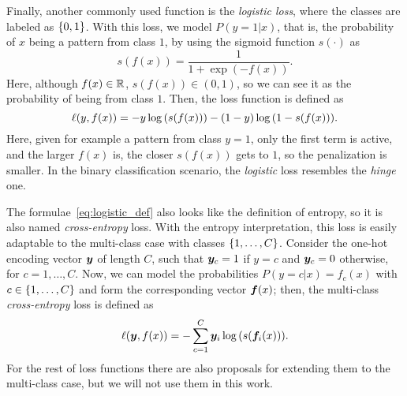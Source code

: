 %
Finally, another commonly used function is the \emph{logistic loss}, where the classes are labeled as $\left\{0, 1\right\}$. With this loss, we model $P(y=1 \vert x)$, that is, the probability of $x$ being a pattern from class $1$, by using the sigmoid function $s(\cdot)$ as 
$$ s(f(x)) = \frac{1}{1 + \exp{(-f(x))}} .$$
Here, although $f(x) \in \mathbb{R}$, $s(f(x)) \in (0, 1)$, so we can see it as the probability of being from class $1$. Then, the loss function is defined as 
\begin{equation}
    \label{eq:logistic_def}
    \lossf(y, f(x)) = - y \log{(s(f(x)))} - (1 - y) \log{(1 - s(f(x)))} .
\end{equation} 
Here, given for example a pattern from class $y=1$, only the first term is active, and the larger $f(x)$ is, the closer $s(f(x))$ gets to $1$, so the penalization is smaller.
In the binary classification scenario, the \emph{logistic} loss resembles the \emph{hinge} one. 

The formulae~\eqref{eq:logistic_def} also looks like the definition of entropy, so it is also named \emph{cross-entropy} loss. 
With the entropy interpretation, this loss is easily adaptable to the multi-class case with classes $\left\{1, \ldots, C\right\}$. Consider the one-hot encoding vector $\bm{y}$ of length $C$, such that $\bm{y}_c = 1$ if $y=c$ and $\bm{y}_c = 0$ otherwise, for $c=1, \ldots, C$.
Now, we can model the probabilities $P(y=c \vert x) = f_c(x)$ with $c \in \left\{1, \ldots, C\right\}$ and form the corresponding vector $\bm{f}(x)$; then, the multi-class \emph{cross-entropy} loss is defined as 
\begin{equation}
    \label{eq:crossentropy_def}
    \lossf(\fv{y}, f(x)) = - \sum_{c=1}^C \fv{y}_i \log{(s(\fv{f}_i(x)))} .
\end{equation} 
For the rest of loss functions there are also proposals for extending them to the multi-class case, but we will not use them in this work.

